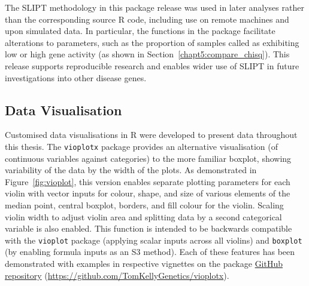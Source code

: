 The \gls{SLIPT} methodology in this package release was used in later analyses rather than the corresponding source R code, including use on remote machines and upon simulated data. In particular, the functions in the package facilitate alterations to parameters, such as the proportion of samples called as exhibiting low or high gene activity (as shown in Section~\ref{chapt5:compare_chisq}). This release supports reproducible research and enables wider use of \gls{SLIPT} in future investigations into other disease genes.

\subsection{Data Visualisation} \label{methods:r_packages_vis}
Customised data visualisations in R \citep{R_core} were developed to present data throughout this thesis. %
%
The \texttt{vioplotx} package provides an alternative visualisation (of continuous variables against categories) to the more familiar boxplot, showing variability of the data by the width of the plots. As demonstrated in Figure~\ref{fig:vioplot}, this version enables separate plotting parameters for each violin with vector inputs for colour, shape, and size of various elements of the median point, central boxplot, borders, and fill colour for the violin. Scaling violin width to adjust violin area and splitting data by a second categorical variable is also enabled. This function is intended to be backwards compatible with the \texttt{vioplot} package \citep{vioplot}  (applying scalar inputs across all violins) and \texttt{boxplot} (by enabling formula inputs as an S3 method). Each of these features has been demonstrated with examples in respective vignettes on the package \href{https://github.com/TomKellyGenetics/vioplotx}{GitHub repository} (\url{https://github.com/TomKellyGenetics/vioplotx}).

